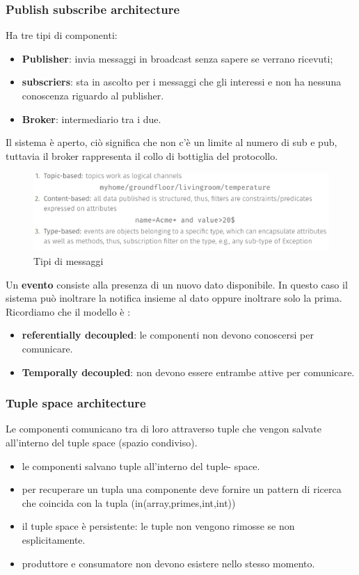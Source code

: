 \documentclass[12pt]{article}
\begin{document}
 	\subsubsection{Publish subscribe architecture}
 	 Ha tre tipi di componenti:
 	 \begin{itemize}
 	 	\item \textbf{Publisher}: invia messaggi in broadcast senza sapere se verrano ricevuti;
 	 	\item \textbf{subscriers}: sta in ascolto per i messaggi che gli interessi e non ha nessuna conoscenza riguardo al publisher.
 	 	\item \textbf{Broker}: intermediario tra i due.
 	 \end{itemize}
  	Il sistema è aperto, ciò significa che non c'è un limite al numero di sub e pub, tuttavia il broker rappresenta il collo di bottiglia del protocollo.\\
  	\begin{figure}[h!]
  		\centering
  		\includegraphics[scale=0.40]{img/bi.png}
  		\caption{Tipi di messaggi}
  	\end{figure}
 	Un \textbf{evento} consiste alla presenza di un nuovo dato disponibile. In questo caso il sistema può inoltrare la notifica insieme al dato oppure inoltrare solo la prima.
 	Ricordiamo che il modello è :
 	\begin{itemize}
 		\item \textbf{referentially decoupled}: le componenti non devono conoscersi per comunicare.
 		\item \textbf{Temporally decoupled}: non devono essere entrambe attive per comunicare.
 	\end{itemize}
 	\subsubsection{Tuple space architecture}
 		Le componenti comunicano tra di loro attraverso tuple che vengon salvate all'interno del tuple space (spazio condiviso).
 		\begin{itemize}
 			\item le componenti salvano tuple all'interno del tuple- space.
 			\item per recuperare un tupla una componente deve fornire un pattern di ricerca che coincida con la tupla (in(array,primes,int,int))
 			\item il tuple space è persistente: le tuple non vengono rimosse se non esplicitamente.
 			\item produttore e consumatore non devono esistere nello stesso momento.
 		\end{itemize}
\end{document}
